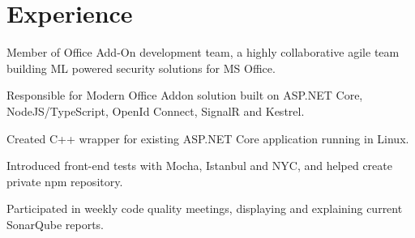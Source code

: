 \documentclass[letterpaper]{cv_12} %
\begin{document}

\section{Experience}

\begin{minipage}[t]{0.5\textwidth} %


\vspace{\topsep} %
\begin{tightitemize}
\item Member of Office Add-On development team, a highly collaborative agile team building ML powered security solutions for MS Office.
\item Responsible for Modern Office Addon solution built on ASP.NET Core, NodeJS/TypeScript, OpenId Connect, SignalR and Kestrel.
\item Created C++ wrapper for existing ASP.NET Core application running in Linux.
\item Introduced front-end tests with Mocha, Istanbul and NYC, and helped create private npm repository.
\item Participated in weekly code quality meetings, displaying and explaining current SonarQube reports.
\end{tightitemize}

\sectionspace%




\sectionspace%





\end{minipage}
\end{document}
